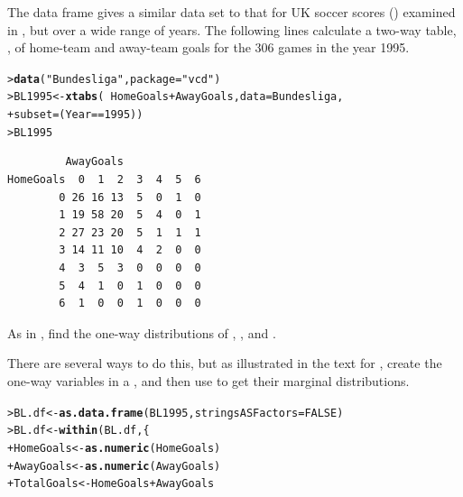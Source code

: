 \documentclass[10pt]{report}\usepackage[]{graphicx}\usepackage[]{color}
\makeatletter
\newcommand{\hlnum}[1]{\textcolor[rgb]{0.686,0.059,0.569}{#1}}%
\newcommand{\hlstr}[1]{\textcolor[rgb]{0.192,0.494,0.8}{#1}}%
\newcommand{\hlopt}[1]{\textcolor[rgb]{0,0,0}{#1}}%
\newcommand{\hlstd}[1]{\textcolor[rgb]{0.345,0.345,0.345}{#1}}%
\newcommand{\hlkwb}[1]{\textcolor[rgb]{0.69,0.353,0.396}{#1}}%
\newcommand{\hlkwc}[1]{\textcolor[rgb]{0.333,0.667,0.333}{#1}}%
\newcommand{\hlkwd}[1]{\textcolor[rgb]{0.737,0.353,0.396}{\textbf{#1}}}%
\newenvironment{kframe}{%
 \def\at@end@of@kframe{}%
 \ifinner\ifhmode%
  \def\at@end@of@kframe{\end{minipage}}%
  \begin{minipage}{\columnwidth}%
 \fi\fi%
 \def\FrameCommand##1{\hskip\@totalleftmargin \hskip-\fboxsep
 \colorbox{shadecolor}{##1}\hskip-\fboxsep
     \hskip-\linewidth \hskip-\@totalleftmargin \hskip\columnwidth}%
 \MakeFramed {\advance\hsize-\width
   \@totalleftmargin\z@ \linewidth\hsize
   \@setminipage}}%
 {\par\unskip\endMakeFramed%
 \at@end@of@kframe}
\newenvironment{knitrout}{}{} %
\renewenvironment{knitrout}{\small\renewcommand{\baselinestretch}{.85}}{} %
\makeatother
\begin{document}
\begin{Exercises}
  \exercise The data frame  gives a similar data set to that for UK soccer scores
  ()
  examined in , but over a wide range of years.  The following lines calculate
  a two-way table, , of home-team and away-team goals
  for the 306 games in the year 1995.
\begin{knitrout}\footnotesize
{}\color{fgcolor}\begin{kframe}
\begin{alltt}
\hlstd{> }\hlkwd{data}\hlstd{(}\hlstr{"Bundesliga"}\hlstd{,} \hlkwc{package} \hlstd{=} \hlstr{"vcd"}\hlstd{)}
\hlstd{> }\hlstd{BL1995} \hlkwb{<-} \hlkwd{xtabs}\hlstd{(}\hlopt{~} \hlstd{HomeGoals} \hlopt{+} \hlstd{AwayGoals,} \hlkwc{data} \hlstd{= Bundesliga,}
\hlstd{+ }                \hlkwc{subset} \hlstd{= (Year} \hlopt{==} \hlnum{1995}\hlstd{))}
\hlstd{> }\hlstd{BL1995}
\end{alltt}
\begin{verbatim}
         AwayGoals
HomeGoals  0  1  2  3  4  5  6
        0 26 16 13  5  0  1  0
        1 19 58 20  5  4  0  1
        2 27 23 20  5  1  1  1
        3 14 11 10  4  2  0  0
        4  3  5  3  0  0  0  0
        5  4  1  0  1  0  0  0
        6  1  0  0  1  0  0  0
\end{verbatim}
\end{kframe}
\end{knitrout}
  \begin{enumerate*}
    \item As in , find the one-way distributions of ,
    , and .
    \begin{ans}
    There are several ways to do this, but as illustrated in the text for , 
    create the one-way variables in a , and then use 
    to get their marginal distributions.
\begin{knitrout}\footnotesize
{}\color{fgcolor}\begin{kframe}
\begin{alltt}
\hlstd{> }\hlstd{BL.df} \hlkwb{<-} \hlkwd{as.data.frame}\hlstd{(BL1995,} \hlkwc{stringsASFactors}\hlstd{=}\hlnum{FALSE}\hlstd{)}
\hlstd{> }\hlstd{BL.df} \hlkwb{<-} \hlkwd{within}\hlstd{(BL.df, \{}
\hlstd{+ }  \hlstd{HomeGoals} \hlkwb{<-} \hlkwd{as.numeric}\hlstd{(HomeGoals)}
\hlstd{+ }  \hlstd{AwayGoals} \hlkwb{<-} \hlkwd{as.numeric}\hlstd{(AwayGoals)}
\hlstd{+ }  \hlstd{TotalGoals} \hlkwb{<-} \hlstd{HomeGoals} \hlopt{+} \hlstd{AwayGoals}

\end{alltt}
\end{kframe}
\end{knitrout}
\end{ans}
\end{enumerate*}
\end{Exercises}
\end{document}
